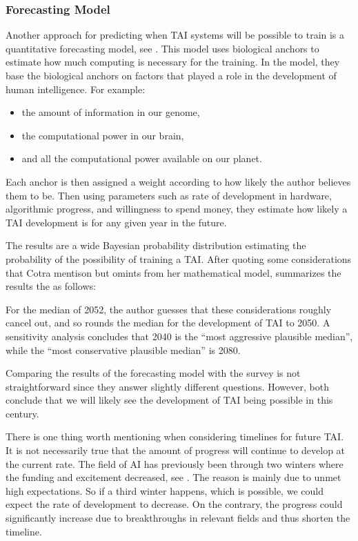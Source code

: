 \documentclass[12pt,A4]{report}
\theoremstyle{definition}
\begin{document}
\subsubsection{Forecasting Model}
Another approach for predicting when TAI systems will be possible to train is a quantitative forecasting model, see \citet{Ajeya}. This model uses biological anchors to estimate how much computing is necessary for the training. In the model, they base the biological anchors on factors that played a role in the development of human intelligence. For example:
\begin{itemize}
  \item the amount of information in our genome, 
  \item the computational power in our brain,
  \item and all the computational power available on our planet. 
\end{itemize}
Each anchor is then assigned a weight according to how likely the author believes them to be. Then using parameters such as rate of development in hardware, algorithmic progress, and willingness to spend money, they estimate how likely a TAI development is for any given year in the future. 

The results are a wide Bayesian probability distribution estimating the probability of the possibility of training a TAI. After quoting some considerations that Cotra mentison but omints from her mathematical model, \citet{an121} summarizes the results the as follows:
\begin{displayquote}
For the median of 2052, the author guesses that these considerations roughly cancel out, and so rounds the median for the development of TAI to 2050. A sensitivity analysis concludes that 2040 is the “most aggressive plausible median”, while the “most conservative plausible median” is 2080.
\end{displayquote}
Comparing the results of the forecasting model with the survey is not straightforward since they answer slightly different questions. However, both conclude that we will likely see the development of TAI being possible in this century.

There is one thing worth mentioning when considering timelines for future TAI. It is not necessarily true that the amount of progress will continue to develop at the current rate. The field of AI has previously been through two winters where the funding and excitement decreased, see \citet[p.42]{RussellNorvig}. The reason is mainly due to unmet high expectations. So if a third winter happens, which is possible, we could expect the rate of development to decrease. On the contrary, the progress could significantly increase due to breakthroughs in relevant fields and thus shorten the timeline.
\end{document}
